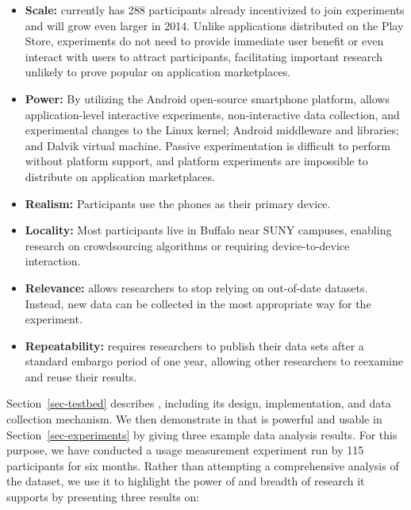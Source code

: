 \begin{itemize}

\item \textbf{Scale:} \PhoneLab{} currently has 288 participants already
incentivized to join experiments and will grow even larger in 2014. Unlike
applications distributed on the Play Store, \PhoneLab{} experiments do not
need to provide immediate user benefit or even interact with users to attract
participants, facilitating important research unlikely to prove popular on
application marketplaces.

\item \textbf{Power:} By utilizing the Android open-source smartphone
platform, \PhoneLab{} allows application-level interactive experiments,
non-interactive data collection, and experimental changes to the Linux
kernel; Android middleware and libraries; and Dalvik virtual machine. Passive
experimentation is difficult to perform without platform support, and
platform experiments are impossible to distribute on application
marketplaces.

\item \textbf{Realism:} Participants use the phones as their primary device.

\item \textbf{Locality:} Most participants live in Buffalo near SUNY campuses,
enabling research on crowdsourcing algorithms or requiring device-to-device
interaction.

\item \textbf{Relevance:} \PhoneLab{} allows researchers to stop relying on
out-of-date datasets. Instead, new data can be collected in the most
appropriate way for the experiment.

\item \textbf{Repeatability:} \PhoneLab{} requires researchers to publish
their data sets after a standard embargo period of one year, allowing other
researchers to reexamine and reuse their results.

\end{itemize}

Section~\ref{sec-testbed} describes \PhoneLab{}, including its design,
implementation, and data collection mechanism. We then demonstrate in that
\PhoneLab{} is powerful and usable in Section~\ref{sec-experiments} by giving
three example data analysis results. For this purpose, we have conducted a
usage measurement experiment run by 115 \PhoneLab{} participants for six
months. Rather than attempting a comprehensive analysis of the dataset, we
use it to highlight the power of \PhoneLab{} and breadth of research it
supports by presenting three results on:

